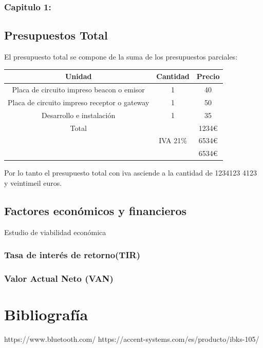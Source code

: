 \documentclass[a4paper ,12pt, onecolumn]{article}
\begin{document}
            \subsubsection{Capitulo 1: }
    \subsection{Presupuestos Total}
        El presupuesto total se compone de la suma de los presupuestos parciales:
        \begin{center}
            \begin{tabular}{||c | c |c ||} 
            \hline
            Unidad & Cantidad & Precio  \\ [0.5ex] 
            \hline\hline
            Placa de circuito impreso beacon o emisor & 1 & 40 \\ 
            Placa de circuito impreso receptor o gateway & 1 & 50 \\ 
            Desarrollo e instalación & 1 & 35 \\ 
            \hline
            \hline
            Total &  & 1234€ \\ 
             & IVA 21\%& 6534€ \\ 
             & & 6534€ \\ 
            \hline
            \end{tabular}
        \end{center}
        Por lo tanto el presupuesto total con iva asciende a la cantidad de 1234123 4123 y veintimeil euros.
    \subsection{Factores económicos y financieros}
    Estudio de viabilidad económica
        \subsubsection{Tasa de interés de retorno(TIR)}
        \subsubsection{Valor Actual Neto (VAN)}

\section{Bibliografía}
https://www.bluetooth.com/
https://accent-systems.com/es/producto/ibks-105/
\end{document}
